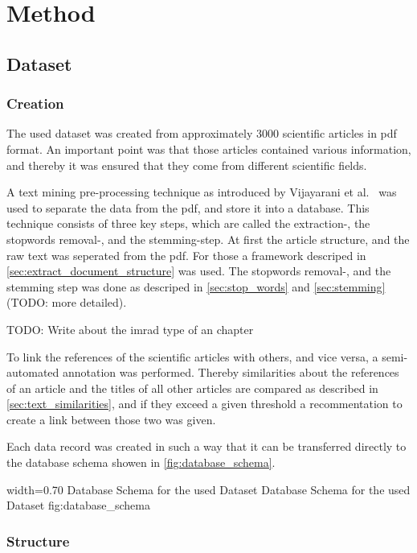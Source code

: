 \chapter{Method}
\label{cha:method}

\section{Dataset}
\label{sec:dataset}

\subsection{Creation}
The used dataset was created from approximately 3000 scientific articles in pdf format. An important point was that those articles contained various information, and thereby it was ensured that they come from different scientific fields.

A text mining pre-processing technique as introduced by Vijayarani et al.~\cite{Vijayarani2015} was used to separate the data from the pdf, and store it into a database.
This technique consists of three key steps, which are called the extraction-, the stopwords removal-, and the stemming-step. At first the article structure, and the raw text was seperated from the pdf. For those a framework descriped in \cref{sec:extract_document_structure} was used. The stopwords removal-, and the stemming step was done as descriped in \cref{sec:stop_words} and \cref{sec:stemming} (TODO: more detailed).

TODO: Write about the imrad type of an chapter

To link the references of the scientific articles with others, and vice versa, a semi-automated annotation was performed. Thereby similarities about the references of an article and the titles of all other articles are compared as described in \cref{sec:text_similarities}, and if they exceed a given threshold a recommentation to create a link between those two was given.

Each data record was created in such a way that it can be transferred directly to the database schema showen in \cref{fig:database_schema}.

      {width=0.70\textwidth}
      {Database Schema for the used Dataset}
      {Database Schema for the used Dataset}
      {fig:database_schema}

\subsection{Structure}
\label{sec:structure}



